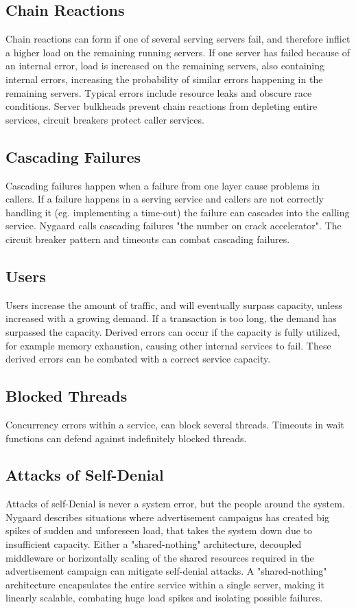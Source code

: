 \subsection{Chain Reactions}
Chain reactions can form if one of several serving servers fail, and therefore inflict a higher load on the remaining running servers. If one server has failed because of an internal error, load is increased on the remaining servers, also containing internal errors, increasing the probability of similar errors happening in the remaining servers. Typical errors include resource leaks and obscure race conditions.
Server bulkheads prevent chain reactions from depleting entire services, circuit breakers protect caller services.

\subsection{Cascading Failures}
Cascading failures happen when a failure from one layer cause problems in callers. If a failure happens in a serving service and callers are not correctly handling it (eg. implementing a time-out) the failure can cascades into the calling service. Nygaard calls cascading failures "the number on crack accelerator"\cite[p. 49]{nygard2007release}.
The circuit breaker pattern and timeouts can combat cascading failures.

\subsection{Users}
Users increase the amount of traffic, and will eventually surpass capacity, unless increased with a growing demand. If a transaction is too long, the demand has surpassed the capacity. Derived errors can occur if the capacity is fully utilized, for example memory exhaustion, causing other internal services to fail. These derived errors can be combated with a correct service capacity.

\subsection{Blocked Threads}
Concurrency errors within a service, can block several threads. Timeouts in wait functions can defend against indefinitely blocked threads.

\subsection{Attacks of Self-Denial}
Attacks of self-Denial is never a system error, but the people around the system. Nygaard describes situations where advertisement campaigns has created big spikes of sudden and unforeseen load, that takes the system down due to insufficient capacity. 
Either a "shared-nothing" architecture, decoupled middleware or horizontally scaling of the shared resources required in the advertisement campaign can mitigate self-denial attacks. A "shared-nothing" architecture encapsulates the entire service within a single server, making it linearly scalable, combating huge load spikes and isolating possible failures.


